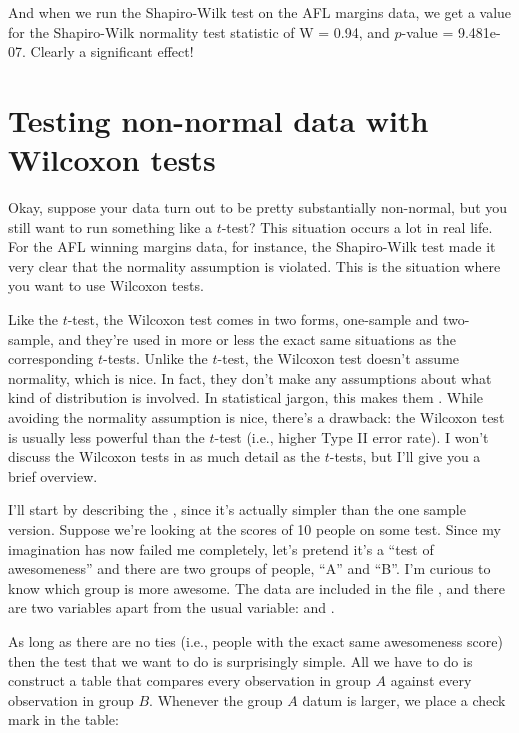\begin{center}
\end{center}

And when we run the Shapiro-Wilk test on the AFL margins data, we get a value for the Shapiro-Wilk normality test statistic of W = 0.94, and $p$-value = 9.481e-07. Clearly a significant effect!


\section{Testing non-normal data with Wilcoxon tests\label{sec:wilcox}}

Okay, suppose your data turn out to be pretty substantially non-normal, but you still want to run something like a $t$-test? This situation occurs a lot in real life. For the AFL winning margins data, for instance, the Shapiro-Wilk test made it very clear that the normality assumption is violated. This is the situation where you want to use Wilcoxon tests. 

Like the $t$-test, the Wilcoxon test comes in two forms, one-sample and two-sample, and they're used in more or less the exact same situations as the corresponding $t$-tests. Unlike the $t$-test, the Wilcoxon test doesn't assume normality, which is nice. In fact, they don't make any assumptions about what kind of distribution is involved. In statistical jargon, this makes them . While avoiding the normality assumption is nice, there's a drawback: the Wilcoxon test is usually less powerful than the $t$-test (i.e., higher Type II error rate). I won't discuss the Wilcoxon tests in as much detail as the $t$-tests, but I'll give you a brief overview.


I'll start by describing the , since it's actually simpler than the one sample version. Suppose we're looking at the scores of 10 people on some test. Since my imagination has now failed me completely, let's pretend it's a ``test of awesomeness'' and there are two groups of people, ``A'' and ``B''. I'm curious to know which group is more awesome. The data are included in the file , and there are two variables apart from the usual  variable:  and .

As long as there are no ties (i.e., people with the exact same awesomeness score) then the test that we want to do is surprisingly simple. All we have to do is construct a table that compares every observation in group $A$ against every observation in group $B$. Whenever the group $A$ datum is larger, we place a check mark in the table:


